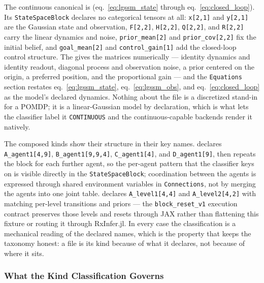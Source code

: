 \documentclass[
  english,
  9pt,
]{extarticle}
\begin{document}
The continuous canonical is
(eq.~\ref{eq:lgssm_state} through eq.~\ref{eq:closed_loop}). Its
\texttt{StateSpaceBlock} declares no categorical tensors at all:
\texttt{x{[}2,1{]}} and \texttt{y{[}2,1{]}} are the Gaussian state and
observation, \texttt{F{[}2,2{]}}, \texttt{H{[}2,2{]}},
\texttt{Q{[}2,2{]}}, and \texttt{R{[}2,2{]}} carry the linear dynamics
and noise, \texttt{prior\_mean{[}2{]}} and \texttt{prior\_cov{[}2,2{]}}
fix the initial belief, and \texttt{goal\_mean{[}2{]}} and
\texttt{control\_gain{[}1{]}} add the closed-loop control structure. The
 gives the matrices numerically ---
identity dynamics and identity readout, diagonal process and observation
noise, a prior centered on the origin, a preferred position, and the
proportional gain --- and the \texttt{Equations} section restates
eq.~\ref{eq:lgssm_state}, eq.~\ref{eq:lgssm_obs}, and
eq.~\ref{eq:closed_loop} as the model's declared dynamics. Nothing about
the file is a discretized stand-in for a POMDP; it is a linear-Gaussian
model by declaration, which is what lets the classifier label it
\texttt{CONTINUOUS} and the continuous-capable backends render it
natively.

The composed kinds show their structure in their key names.
 declares
\texttt{A\_agent1{[}4,9{]}}, \texttt{B\_agent1{[}9,9,4{]}},
\texttt{C\_agent1{[}4{]}}, and \texttt{D\_agent1{[}9{]}}, then repeats
the block for each further agent, so the per-agent pattern that the
classifier keys on is visible directly in the \texttt{StateSpaceBlock};
coordination between the agents is expressed through shared environment
variables in \texttt{Connections}, not by merging the agents into one
joint table.
 declares
\texttt{A\_level1{[}4,4{]}} and \texttt{A\_level2{[}4,2{]}} with
matching per-level transitions and priors --- the
\texttt{block\_reset\_v1} execution contract preserves those levels and
resets through JAX rather than flattening this fixture or routing it
through RxInfer.jl. In every case the classification is a mechanical
reading of the declared names, which is the property that keeps the
taxonomy honest: a file is its kind because of what it declares, not
because of where it sits.

\subsubsection{What the Kind Classification
Governs}\label{what-the-kind-classification-governs}
\end{document}
